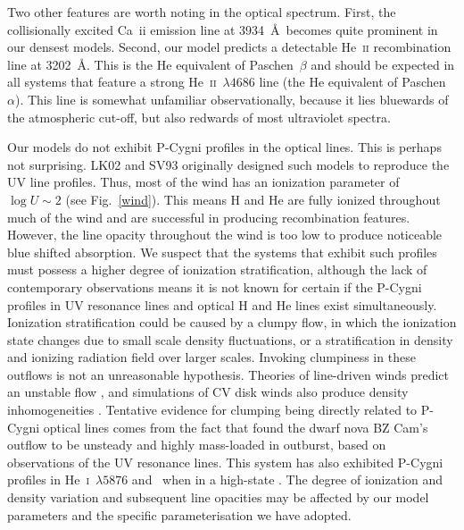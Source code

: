 \documentclass[preprint, a4paper, 11pt]{aastex}
\begin{document}
Two other features are worth noting in the optical
spectrum. First, the collisionally excited Ca~{\sc ii} emission line at 3934~\AA\ 
becomes quite prominent in our densest models. Second, our model predicts a detectable
He~\textsc{ii} recombination line at 3202~\AA. This is the He
equivalent of Paschen~$\beta$ and should be expected in all systems that
feature a strong He~\textsc{ii}~$\lambda4686$ line (the He
equivalent of Paschen~$\alpha$). 
This line is somewhat unfamiliar observationally, because it 
lies bluewards of the atmospheric cut-off, but
also redwards of most ultraviolet spectra. 

Our models do not exhibit P-Cygni profiles in the optical lines.
This is perhaps not surprising. LK02 and SV93 originally designed such models
to reproduce the UV line profiles. Thus, most of the wind
has an ionization parameter of $\log U \sim 2$ (see Fig.~\ref{wind}).
This means H and He are fully ionized throughout 
much of the wind and are successful in producing recombination features.
However, the line opacity throughout the wind is too
low to produce noticeable blue shifted absorption. 
We suspect that the systems that exhibit such profiles must 
possess a higher degree of ionization stratification, although the lack 
of contemporary observations means it is not known for certain if the 
P-Cygni profiles in UV resonance lines and optical H and He lines exist simultaneously.
Ionization stratification could be caused by a clumpy flow, in which the ionization state 
changes due to small scale density fluctuations, or a stratification in density
and ionizing radiation field over larger scales.
Invoking clumpiness in these outflows is not an unreasonable
hypothesis. Theories of line-driven winds predict an unstable flow
\citep{macgregor1979,owockirybicki1984,owockirybicki1985}, and
simulations of CV disk winds also produce density inhomogeneities 
\citep{proga1998,pkdh2002}.
Tentative evidence for clumping being directly related to P-Cygni optical lines
comes from the fact that \cite{prinja2000}
found the dwarf nova BZ Cam's outflow to be unsteady and highly mass-loaded in outburst,
based on observations of the UV resonance lines.
This system has also exhibited P-Cygni profiles in He~\textsc{i}~$\lambda5876$
and \ha\ when in a high-state \citep{patterson1996,RN98}. 
The degree of ionization and density variation and 
subsequent line opacities may be affected by our model parameters
and the specific parameterisation we have adopted.
\end{document}
